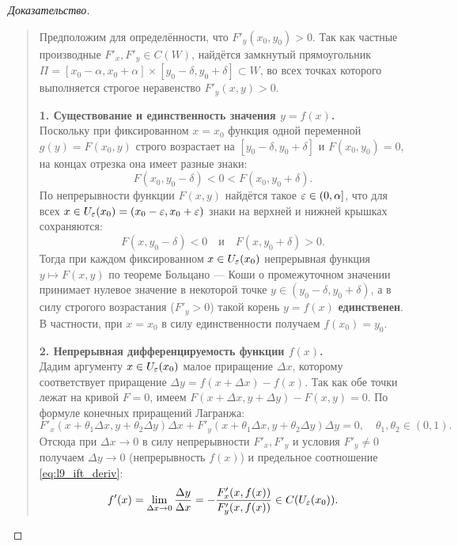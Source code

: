 \begin{proof}[Доказательство]~\\
    \begin{quote}
        Предположим для определённости, что $F'_y(x_0, y_0) > 0$. Так как
        частные производные $F'_x, F'_y \in C(W)$, найдётся замкнутый
        прямоугольник $\Pi = [x_0 - \alpha, x_0 + \alpha] \times
        [y_0 - \delta, y_0 + \delta] \subset W$, во всех точках которого
        выполняется строгое неравенство $F'_y(x, y) > 0$.

        \textbf{1. Существование и единственность значения $y = f(x)$.}\\
        Поскольку при фиксированном $x = x_0$ функция одной переменной
        $g(y) = F(x_0, y)$ строго возрастает на $[y_0 - \delta, y_0 + \delta]$
        и $F(x_0, y_0) = 0$, на концах отрезка она имеет разные знаки:
        \[
            F(x_0, y_0 - \delta) < 0 < F(x_0, y_0 + \delta).
        \]
        По непрерывности функции $F(x, y)$ найдётся такое $\varepsilon \in (0, \alpha]$,
        что для всех $x \in U_\varepsilon(x_0) = (x_0 - \varepsilon, x_0 + \varepsilon)$ знаки на
        верхней и нижней крышках сохраняются:
        \[
            F(x, y_0 - \delta) < 0 \quad \text{и} \quad F(x, y_0 + \delta) > 0.
        \]
        Тогда при каждом фиксированном $x \in U_\varepsilon(x_0)$ непрерывная функция
        $y \mapsto F(x, y)$ по теореме Больцано — Коши о промежуточном значении
        принимает нулевое значение в некоторой точке $y \in (y_0 - \delta, y_0 + \delta)$,
        а в силу строгого возрастания ($F'_y > 0$) такой корень $y = f(x)$
        \textbf{единственен}. В частности, при $x = x_0$ в силу единственности
        получаем $f(x_0) = y_0$.

        \textbf{2. Непрерывная дифференцируемость функции $f(x)$.}\\
        Дадим аргументу $x \in U_\varepsilon(x_0)$ малое приращение $\Delta x$, которому
        соответствует приращение $\Delta y = f(x + \Delta x) - f(x)$. Так как
        обе точки лежат на кривой $F = 0$, имеем $F(x + \Delta x, y + \Delta y)
        - F(x, y) = 0$. По формуле конечных приращений Лагранжа:
        \[
            F'_x(x + \theta_1 \Delta x, y + \theta_2 \Delta y) \Delta x +
            F'_y(x + \theta_1 \Delta x, y + \theta_2 \Delta y) \Delta y = 0,
            \quad \theta_1, \theta_2 \in (0, 1).
        \]
        Отсюда при $\Delta x \to 0$ в силу непрерывности $F'_x, F'_y$ и
        условия $F'_y \neq 0$ получаем $\Delta y \to 0$ (непрерывность $f(x)$)
        и предельное соотношение \eqref{eq:l9_ift_deriv}:
        \[
            f'(x) = \lim_{\Delta x \to 0} \frac{\Delta y}{\Delta x} =
            -\frac{F'_x(x, f(x))}{F'_y(x, f(x))} \in C(U_\varepsilon(x_0)).
        \]
    \end{quote}
\end{proof}

